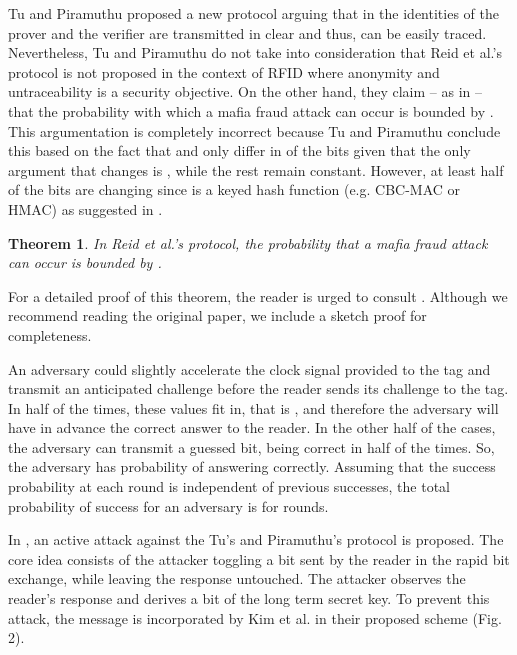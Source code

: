 \documentclass{article}
\newtheorem{theorem}{Theorem}\newtheorem{proposition}[theorem]{Proposition}
\newenvironment{proof}[1][Proof]{\begin{trivlist}
\item[\hskip \labelsep {\bfseries #1}]}{\end{trivlist}}
\begin{document}
Tu and Piramuthu \cite{TuP-2007-rfidtechnology} proposed a new protocol arguing that in \cite{reid2007} the identities of the prover and the verifier are transmitted in clear and thus, can be easily traced.  Nevertheless, Tu and Piramuthu do not take into consideration that Reid et al.'s protocol is not proposed in the context of RFID where anonymity and untraceability is a security objective.  On the other hand, they claim -- as in  \cite{KimAKSP-2008-icisc} -- that the probability with which a mafia fraud attack can occur is bounded by  \cite{piramuthu07}. This argumentation is completely incorrect because Tu and Piramuthu conclude this based on the fact that  and  only differ in  of the bits given that the only argument that changes is , while the rest remain constant. However,  at least half of the bits are changing since  is a keyed hash function (e.g. CBC-MAC or HMAC) as suggested in \cite{reid2007}.
\begin{theorem}\label{th::Reid}
In Reid et al.'s protocol, the probability that a mafia fraud attack can occur is bounded by  \cite{Mitro1kotsaDPH10}.
\end{theorem}

For a detailed proof of this theorem, the reader is urged to consult \cite{Mitro1kotsaDPH10}. Although we recommend reading the original paper, we include a sketch proof for completeness.

\begin{proof}[Sketch Proof]
An adversary could slightly accelerate the clock signal provided to the tag and transmit an anticipated challenge  before the reader sends its challenge  to the tag. In half of the times, these values fit in, that is , and therefore the adversary will have in advance the correct answer  to the reader. In the other half of the cases, the adversary can transmit a guessed bit, being correct in half of the times. So, the adversary has  probability of answering correctly.  Assuming that the success probability at each round is independent of previous successes, the total probability of success for an adversary is  for  rounds. \end{proof}

In \cite{KimAKSP-2008-icisc}, an active attack against the Tu's and Piramuthu's protocol is proposed. The core idea consists of the attacker toggling a bit sent by the reader in the rapid bit exchange, while leaving the response untouched. The attacker observes the reader's response and derives a bit of the long term secret key. To prevent this attack, the message  is incorporated by Kim et al. in their proposed scheme (Fig. 2).
\end{document}
